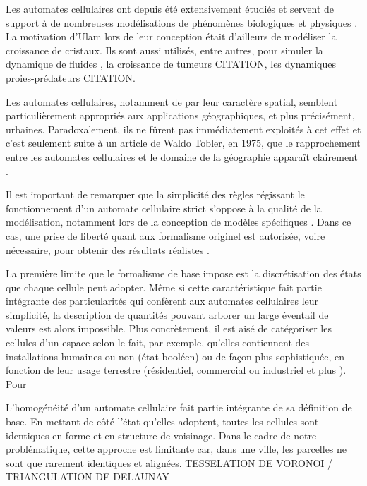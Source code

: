 \documentclass[10pt]{article}
\begin{document}
\begin{multicols}{2}
Les automates cellulaires ont depuis été extensivement étudiés et
servent de support à de nombreuses modélisations de phénomènes
biologiques et physiques \cite{Ganguly}. La motivation d'Ulam lors de
leur conception était d'ailleurs de modéliser la croissance de
cristaux. Ils sont aussi utilisés, entre autres, pour simuler la
dynamique de fluides \cite{Frisch1986}, la croissance de tumeurs
CITATION, les dynamiques proies-prédateurs CITATION.

Les automates cellulaires, notamment de par leur caractère spatial,
semblent particulièrement appropriés aux applications géographiques,
et plus précisément, urbaines. Paradoxalement, ils ne fûrent pas
immédiatement exploités à cet effet et c'est seulement suite à un
article de Waldo Tobler, en 1975, que le rapprochement entre les
automates cellulaires et le domaine de la géographie apparaît
clairement \cite{Tobler1975}.

Il est important de remarquer que la simplicité des règles régissant
le fonctionnement d'un automate cellulaire strict s'oppose à la
qualité de la modélisation, notamment lors de la conception de modèles
spécifiques \cite{Torrens2001}. Dans ce cas, une prise de liberté
quant aux formalisme originel est autorisée, voire nécessaire, pour
obtenir des résultats réalistes \cite{White1998}.

La première limite que le formalisme de base impose est la
discrétisation des états que chaque cellule peut adopter. Même si
cette caractéristique fait partie intégrante des particularités qui
confèrent aux automates cellulaires leur simplicité, la description de
quantités pouvant arborer un large éventail de valeurs est alors
impossible. Plus concrètement, il est aisé de catégoriser les cellules
d'un espace selon le fait, par exemple, qu'elles contiennent des
installations humaines ou non (état booléen)
\cite{Benguigui2004,Cornu} ou de façon plus sophistiquée, en fonction
de leur usage terrestre (résidentiel, commercial ou industriel
\cite{Lechner} et plus \cite{Dubos-Paillard203}). Pour

L'homogénéité d'un automate cellulaire fait partie intégrante de sa
définition de base. En mettant de côté l'état qu'elles adoptent,
toutes les cellules sont identiques en forme et en structure de
voisinage. Dans le cadre de notre problématique, cette approche est
limitante car, dans une ville, les parcelles ne sont que rarement
identiques et alignées. TESSELATION DE VORONOI / TRIANGULATION DE
DELAUNAY


\end{multicols}
\end{document}
